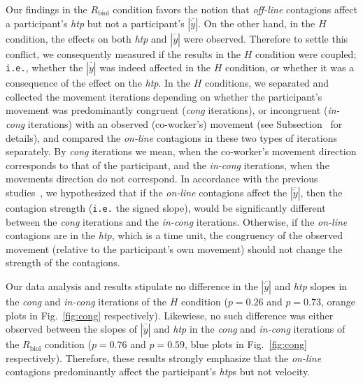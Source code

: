Our findings in the $R_{\text{biol}}$ condition favors the notion that \textit{off-line} contagions affect a participant's {\it htp} but not a participant's $|\overline{\dot{y}}|$. On the other hand, in the $H$ condition, the effects on both {\it htp} and $|\overline{\dot{y}}|$ were observed. Therefore to settle this conflict, we consequently measured if the results in the $H$ condition were coupled; \texttt{i.e.}, whether the $|\overline{\dot{y}}|$ was indeed affected in the $H$ condition, or whether it was a consequence of the effect on the {\it htp}. In the $H$ conditions, we separated and collected the movement iterations depending on whether the participant's movement was predominantly congruent ({\it cong} iterations), or incongruent ({\it in-cong} iterations) with an observed (co-worker's) movement (see Subsection~ for details), and compared the {\it on-line} contagions in these two types of iterations separately. By {\it cong} iterations we mean, when the co-worker's movement direction corresponds to that of the participant, and the {\it in-cong} iterations, when the movements direction do not correspond. In accordance with the previous studies~\cite{ Kilner:SocialNeuro:2007, Bisio:PlosOne:2010, Noy:B&C:2009}, we hypothesized that if the \textit{on-line} contagions affect the $|\overline{\dot{y}}|$, then the contagion strength (\texttt{i.e.} the signed slope), would be significantly different between the {\it cong} iterations and the {\it in-cong} iterations. Otherwise, if the {\it on-line} contagions are in the {\it htp}, which is a time unit, the congruency of the observed movement (relative to the participant's own movement) should not change the strength of the contagions.

Our data analysis and results stipulate no difference in the $|\overline{\dot{y}}|$ and {\it htp} slopes in the {\it cong} and {\it in-cong} iterations of the $H$ condition ($p = 0.26$ and $p = 0.73$, orange plots in Fig.~\ref{fig:cong} respectively). Likewiese, no such difference was either observed between the slopes of $|\overline{\dot{y}}|$  and {\it htp} in the {\it cong} and {\it in-cong} iterations of the $R_{\text{biol}}$ condition ($p = 0.76$ and $p = 0.59$, blue plots in Fig.~\ref{fig:cong} respectively). Therefore, these results strongly emphasize that the \textit{on-line} contagions predominantly affect the participant's {\it htp}s but not velocity.



